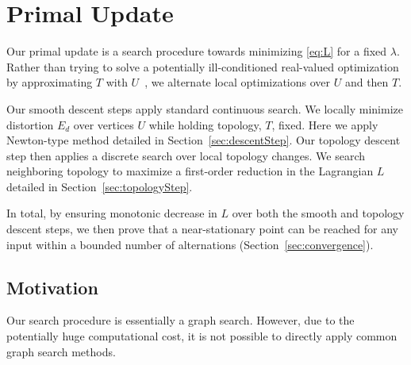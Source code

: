 
\section{Primal Update}%
\label{sec:DCSearch}

Our primal update is a search procedure towards minimizing \eqref{eq:L} for a fixed $\lambda$. 
Rather than trying to solve a potentially ill-conditioned real-valued optimization by approximating $T$ with $U$\ \cite{Poranne2017Autocuts}, we alternate local optimizations over $U$ and then $T$. 

Our smooth descent steps apply standard continuous search. We locally minimize distortion $E_d$ over vertices $U$ while holding topology, $T$, fixed. Here we apply Newton-type method detailed in Section~\ref{sec:descentStep}.
%
Our topology descent step then applies a discrete search over local topology changes. We search neighboring topology to maximize a first-order reduction in the Lagrangian $L$ detailed in Section~\ref{sec:topologyStep}. 

In total, by ensuring monotonic decrease in $L$ over both the smooth and topology descent steps, we then prove that a near-stationary point can be reached for any input within a bounded number of alternations (Section~\ref{sec:convergence}).  

\subsection{Motivation}


Our search procedure is essentially a graph search. However, due to the potentially huge computational cost, it is not possible to directly apply common graph search methods.


